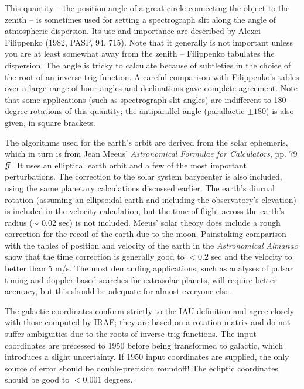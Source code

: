 \par
This quantity -- the position angle of a great circle connecting the
object to the zenith -- is sometimes used for setting a spectrograph
slit along the angle of atmospheric dispersion.  Its use and importance
are described by Alexei Filippenko (1982, PASP, 94, 715).  Note that
it generally is not important unless you are at least somewhat away
from the zenith -- Filippenko tabulates the dispersion.
The angle is tricky to calculate because of subtleties in the choice
of the root of an inverse trig function.  A careful comparison
with Filippenko's tables over a large range of hour angles and
declinations gave complete agreement.  Note that some applications (such
as spectrograph slit angles) are indifferent to 180-degree rotations of
this quantity; the antiparallel angle (parallactic $\pm 180$) is also
given, in square brackets.
\par
{}

The algorithms used for the earth's orbit are derived from the solar 
ephemeris, which in turn is from Jean Meeus' 
{\it Astronomical Formulae for Calculators}, pp. 79$\it ff$.  It uses 
an elliptical earth orbit and a few of the most important perturbations.  
The correction to the solar system barycenter is also included, using the same
planetary calculations discussed earlier.  
The earth's diurnal rotation (assuming an ellipsoidal earth and 
including the observatory's elevation) 
is included in the velocity calculation, but the time-of-flight across
the earth's radius ($\sim$ 0.02 sec) is not included.
Meeus' solar theory does include a rough correction for the recoil of
the earth due to the moon.
Painstaking
comparison with the tables of position and velocity of the earth
in the {\it Astronomical Almanac} show that the time correction is
generally good to $< 0.2$ sec and the velocity to better than 5 m/s.
The most demanding applications, such as analyses of pulsar
timing and doppler-based searches for extrasolar planets, will require
better accuracy, but this should be adequate for almost everyone else.

\par
The galactic coordinates conform strictly to the IAU definition and
agree closely with those computed by IRAF; they are based on a
rotation matrix and do not suffer ambiguities due to the roots of
inverse trig functions.  
The input coordinates are precessed to 1950 before being 
transformed to galactic, which introduces a slight 
uncertainty.  If 1950 input coordinates are supplied,
the only source of error should be double-precision roundoff!
The ecliptic coordinates should be good to $< 0.001$ degrees.

